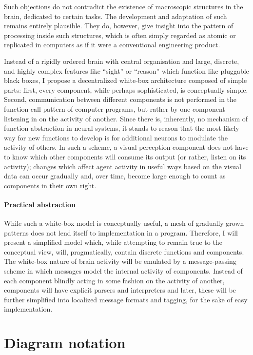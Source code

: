 \documentclass[]{scrartcl}
\theoremstyle{break}
\begin{document}
Such objections do not contradict the existence of macroscopic structures in the brain, dedicated to certain tasks. The development and adaptation of such remains entirely plausible. They do, however, give insight into the pattern of processing inside such structures, which is often simply regarded as atomic or replicated in computers as if it were a conventional engineering product.

Instead of a rigidly ordered brain with central organisation and large, discrete, and highly complex features like ``sight'' or ``reason'' which function like pluggable black boxes, I propose a decentralized white-box architecture composed of simple parts: first, every component, while perhaps sophisticated, is conceptually simple. Second, communication between different components is not performed in the function-call pattern of computer programs, but rather by one component listening in on the activity of another. Since there is, inherently, no mechanism of function abstraction in neural systems, it stands to reason that the most likely way for new functions to develop is for additional neurons to modulate the activity of others. In such a scheme, a visual perception component does not have to know which other components will consume its output (or rather, listen on its activity); changes which affect agent activity in useful ways based on the visual data can occur gradually and, over time, become large enough to count as components in their own right.

\paragraph{Practical abstraction}

While such a white-box model is conceptually useful, a mesh of gradually grown patterns does not lend itself to implementation in a program. Therefore, I will present a simplified model which, while attempting to remain true to the conceptual view, will, pragmatically, contain discrete functions and components. The white-box nature of brain activity will be emulated by a message-passing scheme in which messages model the internal activity of components. Instead of each component blindly acting in some fashion on the activity of another, components will have explicit parsers and interpreters and later, these will be further simplified into localized message formats and tagging, for the sake of easy implementation.

\section{Diagram notation}
\end{document}

